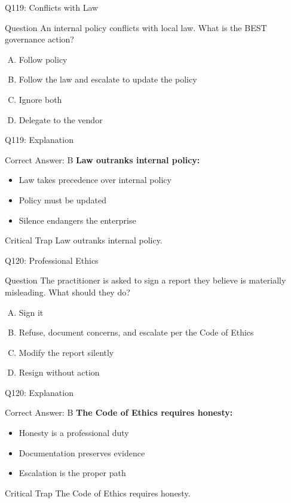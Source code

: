 \documentclass{beamer}
\begin{document}
	\begin{frame}{Q119: Conflicts with Law}
		\begin{block}{Question}
			An internal policy conflicts with local law. What is the BEST governance action?
		\end{block}
		\begin{enumerate}[(A)]
			\item Follow policy
			\item Follow the law and escalate to update the policy
			\item Ignore both
			\item Delegate to the vendor
		\end{enumerate}
	\end{frame}
	
	\begin{frame}{Q119: Explanation}
		\begin{block}{Correct Answer: B}
			\textbf{Law outranks internal policy:}
			\begin{itemize}
				\item Law takes precedence over internal policy
				\item Policy must be updated
				\item Silence endangers the enterprise
			\end{itemize}
		\end{block}
		\begin{alertblock}{Critical Trap}
			Law outranks internal policy.
		\end{alertblock}
	\end{frame}
	
	\begin{frame}{Q120: Professional Ethics}
		\begin{block}{Question}
			The practitioner is asked to sign a report they believe is materially misleading. What should they do?
		\end{block}
		\begin{enumerate}[(A)]
			\item Sign it
			\item Refuse, document concerns, and escalate per the Code of Ethics
			\item Modify the report silently
			\item Resign without action
		\end{enumerate}
	\end{frame}
	
	\begin{frame}{Q120: Explanation}
		\begin{block}{Correct Answer: B}
			\textbf{The Code of Ethics requires honesty:}
			\begin{itemize}
				\item Honesty is a professional duty
				\item Documentation preserves evidence
				\item Escalation is the proper path
			\end{itemize}
		\end{block}
		\begin{alertblock}{Critical Trap}
			The Code of Ethics requires honesty.
		\end{alertblock}
	\end{frame}
	
\end{document}

